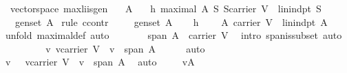 \begin{isabellebody}
\ {\isacharparenleft}\ vectorspace{\isacharparenright}\ max{\isacharunderscore}li{\isacharunderscore}is{\isacharunderscore}gen{\isacharcolon}\isanewline
\ \ \ A\isanewline
\ \ \ h{}{\isacharcolon}\ {\isachardoublequoteopen}maximal\ A\ {\isacharparenleft}{\isasymlambda}S{\isachardot}\ S{\isasymsubseteq}carrier\ V\ {\isasymand}\ lin{\isacharunderscore}indpt\ S{\isacharparenright}{\isachardoublequoteclose}\isanewline
\ \ \ {\isachardoublequoteopen}gen{\isacharunderscore}set\ A{\isachardoublequoteclose}\isanewline
%
\isadelimproof
%
\endisadelimproof
%
\isatagproof
{}\isamarkupfalse%
\ {\isacharparenleft}rule\ ccontr{\isacharparenright}\isanewline
\ \ \isamarkupfalse%
\ {}{\isacharcolon}\ {\isachardoublequoteopen}{\isasymnot}{\isacharparenleft}gen{\isacharunderscore}set\ A{\isacharparenright}{\isachardoublequoteclose}\isanewline
\ \ \isamarkupfalse%
\ h{}\ \isamarkupfalse%
\ {}{\isacharcolon}\ {\isachardoublequoteopen}\ A{\isasymsubseteq}\ carrier\ V\ {\isasymand}\ lin{\isacharunderscore}indpt\ A{\isachardoublequoteclose}\ \isamarkupfalse%
\ {\isacharparenleft}unfold\ maximal{\isacharunderscore}def{\isacharcomma}\ auto{\isacharparenright}\isanewline
\ \ \isamarkupfalse%
\ {}\ \isamarkupfalse%
\ {}{\isacharcolon}\ {\isachardoublequoteopen}span\ A\ {\isasymsubseteq}\ carrier\ V{\isachardoublequoteclose}\ \isamarkupfalse%
\ {\isacharparenleft}intro\ span{\isacharunderscore}is{\isacharunderscore}subset{}{\isacharcomma}\ auto{\isacharparenright}\isanewline
\ \ \isamarkupfalse%
\ {}\ {}\ {}\ \isamarkupfalse%
\ {}{\isacharcolon}\ {\isachardoublequoteopen}{\isasymexists}v{\isachardot}\ v{\isasymin}carrier\ V\ {\isasymand}\ v\ {\isasymnotin}\ {\isacharparenleft}span\ A{\isacharparenright}{\isachardoublequoteclose}\isanewline
\ \ \ \ \isamarkupfalse%
\ auto\isanewline
\ \ \isamarkupfalse%
\ {}\ \isamarkupfalse%
\ v\ \ {}{\isacharcolon}\ {\isachardoublequoteopen}v{\isasymin}carrier\ V\ {\isasymand}\ v\ {\isasymnotin}\ {\isacharparenleft}span\ A{\isacharparenright}{\isachardoublequoteclose}\ \isamarkupfalse%
\ auto\isanewline
\ \ \isamarkupfalse%
\ {}{\isacharcolon}\ {\isachardoublequoteopen}v{\isasymnotin}A{\isachardoublequoteclose}\ \isanewline

\end{isabellebody}
